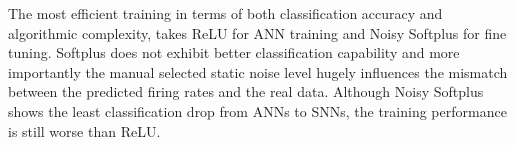\documentclass{article}
\begin{document}




The most efficient training in terms of both classification accuracy and algorithmic complexity, takes ReLU for ANN training and Noisy Softplus for fine tuning.
Softplus does not exhibit better classification capability and more importantly the manual selected static noise level hugely influences the mismatch between the predicted firing rates and the real data.
Although Noisy Softplus shows the least classification drop from ANNs to SNNs, the training performance is still worse than ReLU.
\end{document}
